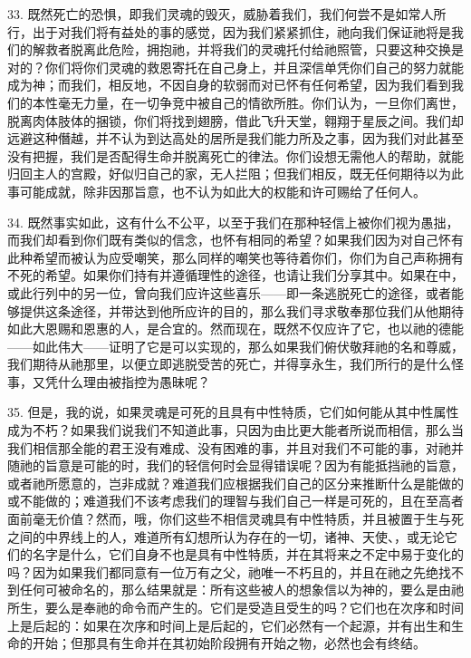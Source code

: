 33. 既然死亡的恐惧，即我们灵魂的毁灭，威胁着我们，我们何尝不是如常人所行，出于对我们将有益处的事的感觉，因为我们紧紧抓住，祂向我们保证祂将是我们的解救者脱离此危险，拥抱祂，并将我们的灵魂托付给祂照管，只要这种交换是对的？你们将你们灵魂的救恩寄托在自己身上，并且深信单凭你们自己的努力就能成为神；而我们，相反地，不因自身的软弱而对已怀有任何希望，因为我们看到我们的本性毫无力量，在一切争竞中被自己的情欲所胜。你们认为，一旦你们离世，脱离肉体肢体的捆锁，你们将找到翅膀，借此飞升天堂，翱翔于星辰之间。我们却远避这种僭越，并不认为到达高处的居所是我们能力所及之事，因为我们对此甚至没有把握，我们是否配得生命并脱离死亡的律法。你们设想无需他人的帮助，就能归回主人的宫殿，好似归自己的家，无人拦阻；但我们相反，既无任何期待以为此事可能成就，除非因那旨意，也不认为如此大的权能和许可赐给了任何人。\par

34. 既然事实如此，这有什么不公平，以至于我们在那种轻信上被你们视为愚拙，而我们却看到你们既有类似的信念，也怀有相同的希望？如果我们因为对自己怀有此种希望而被认为应受嘲笑，那么同样的嘲笑也等待着你们，你们为自己声称拥有不死的希望。如果你们持有并遵循理性的途径，也请让我们分享其中。如果在中，或此行列中的另一位，曾向我们应许这些喜乐——即一条逃脱死亡的途径，或者能够提供这条途径，并带达到他所应许的目的，那么我们寻求敬奉那位我们从他期待如此大恩赐和恩惠的人，是合宜的。然而现在，既然不仅应许了它，也以祂的德能——如此伟大——证明了它是可以实现的，那么如果我们俯伏敬拜祂的名和尊威，我们期待从祂那里，以便立即逃脱受苦的死亡，并得享永生，我们所行的是什么怪事，又凭什么理由被指控为愚昧呢？\par

35. 但是，我的说，如果灵魂是可死的且具有中性特质，它们如何能从其中性属性成为不朽？如果我们说我们不知道此事，只因为由比更大能者所说而相信，那么当我们相信那全能的君王没有难成、没有困难的事，并且对我们不可能的事，对祂并随祂的旨意是可能的时，我们的轻信何时会显得错误呢？因为有能抵挡祂的旨意，或者祂所愿意的，岂非成就？难道我们应根据我们自己的区分来推断什么是能做的或不能做的；难道我们不该考虑我们的理智与我们自己一样是可死的，且在至高者面前毫无价值？然而，哦，你们这些不相信灵魂具有中性特质，并且被置于生与死之间的中界线上的人，难道所有幻想所认为存在的一切，诸神、天使、，或无论它们的名字是什么，它们自身不也是具有中性特质，并在其将来之不定中易于变化的吗？因为如果我们都同意有一位万有之父，祂唯一不朽且的，并且在祂之先绝找不到任何可被命名的，那么结果就是：所有这些被人的想象信以为神的，要么是由祂所生，要么是奉祂的命令而产生的。它们是受造且受生的吗？它们也在次序和时间上是后起的：如果在次序和时间上是后起的，它们必然有一个起源，并有出生和生命的开始；但那具有生命并在其初始阶段拥有开始之物，必然也会有终结。\par

